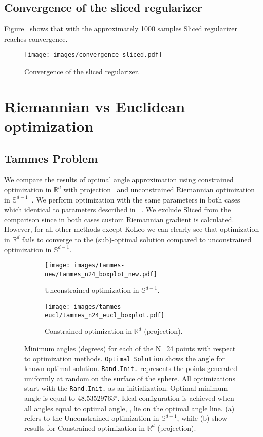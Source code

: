 \documentclass[10pt]{article} %
\begin{document}
\subsection{Convergence of the sliced regularizer}
Figure~ shows that with the approximately 1000 samples Sliced regularizer reaches convergence.
\begin{figure}
    \centering
    \texttt{[image: images/convergence\_sliced.pdf]}
    \caption{Convergence of the sliced regularizer.}
    \label{fig:sliced-conv}
\end{figure}

\section{Riemannian vs Euclidean optimization}
\label{app:rgradVSegrad}
\subsection{Tammes Problem}
We compare the results of optimal angle approximation using constrained optimization in $\mathbb{R}^d$ with projection~ and unconstrained Riemannian optimization in $\mathbb{S}^{d-1}$~. We perform optimization with the same parameters in both cases which identical to parameters described in ~. We exclude Sliced from the comparison since in both cases custom Riemannian gradient is calculated. However, for all other methods except KoLeo we can clearly see that optimization in $\mathbb{R}^d$ fails to converge to the (sub)-optimal solution compared to unconstrained optimization in $\mathbb{S}^{d-1}$.

\begin{figure}
    \begin{subfigure}{\columnwidth}
    \label{fig:tammes-riemann-24}
        \centering
        \texttt{[image: images/tammes-new/tammes\_n24\_boxplot\_new.pdf]}
        \caption{Unconstrained optimization in  $\mathbb{S}^{d-1}$.}
    \end{subfigure}
    \begin{subfigure}{\columnwidth}
    \label{fig:tammes-eucl-24}
        \centering
        \texttt{[image: images/tammes-eucl/tammes\_n24\_eucl\_boxplot.pdf]}
        \caption{Constrained optimization in $\mathbb{R}^d$ (projection).}
    \end{subfigure}
    \caption{Minimum angles (degrees) for each of the N=24 points with respect to optimization methods. \texttt{Optimal Solution} shows the angle for known optimal solution. \texttt{Rand.Init.} represents the points generated uniformly at random on the surface of the sphere. All optimizations start with the \texttt{Rand.Init.} as an initialization. Optimal minimum angle is equal to 48.53529763$^{\circ}$. Ideal configuration is achieved when all angles equal to optimal angle, \ie, lie on the optimal angle line. (a) refers to the Unconstrained optimization in  $\mathbb{S}^{d-1}$, while (b) show results for Constrained optimization in $\mathbb{R}^d$ (projection).}
\end{figure}
\end{document}
